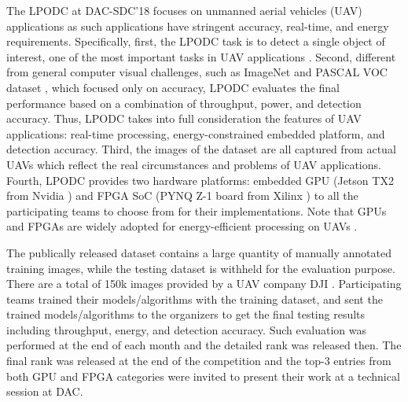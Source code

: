 \documentclass[10pt,journal,compsoc]{IEEEtran}
\begin{document}
The LPODC at DAC-SDC'18 focuses on unmanned aerial vehicles (UAV) applications as such applications have stringent accuracy, real-time, and energy requirements.
Specifically, first, the LPODC task is to detect a single object of interest, one of the most important tasks in UAV applications \cite{torres2015automatic}.
Second, different from general computer visual challenges, such as ImageNet \cite{russakovsky2015imagenet} and PASCAL VOC dataset \cite{everingham2010pascal}, which focused
only on accuracy, LPODC evaluates the final performance based on a combination of throughput, power, and detection accuracy. Thus, LPODC takes into full consideration the features of UAV applications: real-time processing, energy-constrained embedded platform, and detection accuracy.
Third, the images of the dataset are all captured from actual UAVs which reflect the real circumstances and problems of UAV applications.
Fourth, LPODC provides two hardware platforms: embedded GPU (Jetson TX2 from Nvidia \cite{nvidia}) and FPGA SoC (PYNQ Z-1 board from Xilinx \cite{xilinx}) to all the participating teams to choose from for their implementations.
Note that GPUs and FPGAs are widely adopted for energy-efficient processing on UAVs \cite{chao2013survey}.

The publically released dataset contains a large quantity of manually annotated training images, while the testing dataset is withheld for the evaluation purpose.
There are a total of 150k images provided by a UAV company DJI \cite{dji}.
Participating teams trained their models/algorithms with the training dataset, and sent the trained models/algorithms to the organizers to get the final testing results including throughput, energy, and detection accuracy.
Such evaluation was performed at the end of each month and the detailed rank was released then.
The final rank was released at the end of the competition and the top-3 entries from both GPU and FPGA categories were invited to present their work at a technical session at DAC.
\end{document}

